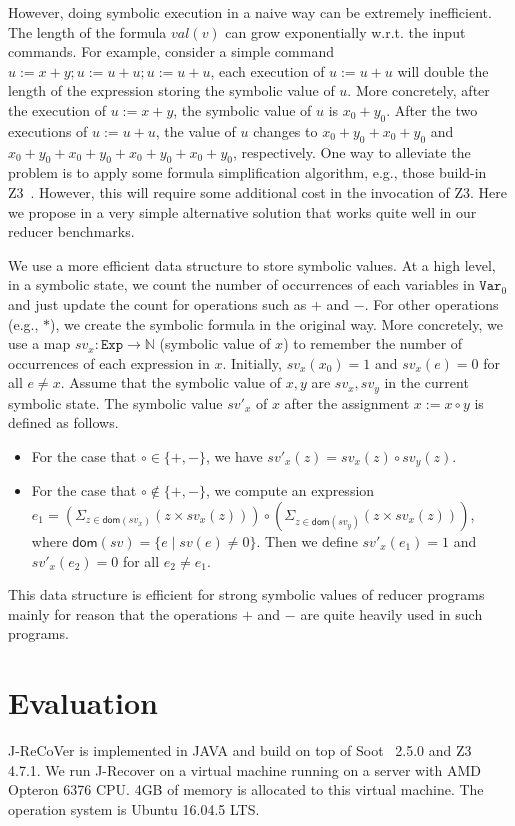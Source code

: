 \documentclass{llncs}
\newcommand{\Var}{\mathtt{Var}}
\newcommand{\Exp}{\mathtt{Exp}}
\newcommand{\dom}[1]{\mathsf{dom}(#1)}
\begin{document}
However, doing symbolic execution in a naive way can be extremely inefficient. 
The length of the formula $val(v)$ can grow exponentially w.r.t. the input commands. For example, consider a simple command $u:=x+y;u:=u+u;u:=u+u$, each execution of $u:= u+ u$ will double the length of the expression storing the symbolic value of $u$. More concretely, after the execution of $u:=x+y$, the symbolic value of $u$ is $x_0+y_0$. After the two executions of $u:=u+u$, the value of $u$ changes to $x_0+y_0+x_0+y_0$ and $x_0+y_0+x_0+y_0+x_0+y_0+x_0+y_0$, respectively. One way to alleviate the problem is to apply some formula simplification algorithm, e.g., those build-in Z3~\cite{z3}. 
However, this will require some additional cost in the invocation of Z3. Here we propose in a very simple alternative solution that works quite well in our reducer benchmarks.

We use a more efficient data structure to store symbolic values. At a high level, in a symbolic state, we count the number of occurrences of each variables in $\Var_0$ and just update the count for operations such as $+$ and $-$. For other operations (e.g., $*$), we create the symbolic formula in the original way.
More concretely, we use a map $sv_x:\Exp\rightarrow \mathbb{N}$ (symbolic value of $x$) to remember the number of occurrences of each expression in $x$. Initially, $sv_x(x_0) = 1$ and $sv_x (e) =0$ for all $e\neq x$. Assume that the symbolic value of $x,y$ are $sv_x,sv_y$ in the current symbolic state. The symbolic value $sv'_x$ of $x$ after the assignment $x:=x\circ y$ is defined as follows. 

\begin{itemize}
	\item For the case that $\circ \in\{+,-\}$, we have $sv'_x(z) = sv_x(z)\circ  sv_y(z)$. 
	\item For the case that $\circ \notin\{+,-\}$, we compute an expression $e_1= (\Sigma_{z\in \dom{sv_x}} (z\times sv_x(z)) )\circ (\Sigma_{z\in \dom{sv_y}} (z\times sv_x(z)))$, where $\dom{sv}=\{e\mid sv(e)\neq 0\}$. Then we define $sv'_x(e_1) =1$ and $sv'_x(e_2) = 0$ for all $e_2\neq e_1$. 
\end{itemize}

This data structure is efficient for strong symbolic values of reducer programs mainly for reason that the operations $+$ and $-$ are quite heavily used in such programs. 



\section{Evaluation}
\label{section:exp}
J-ReCoVer is implemented in JAVA and build on top of Soot~\cite{soot} 2.5.0 and Z3~\cite{z3} 4.7.1. We run J-Recover on a virtual machine running on a server with AMD Opteron 6376 CPU. 4GB of memory is allocated to this virtual machine. The operation system is Ubuntu 16.04.5 LTS. 
\end{document}
